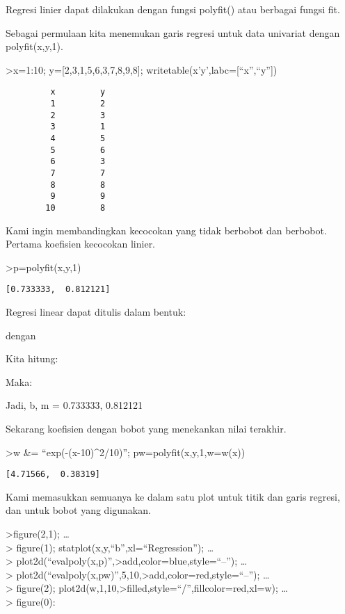 \documentclass[
]{book}
\begin{document}
Regresi linier dapat dilakukan dengan fungsi polyfit() atau berbagai fungsi fit.

Sebagai permulaan kita menemukan garis regresi untuk data univariat dengan polyfit(x,y,1).

\textgreater x=1:10; y={[}2,3,1,5,6,3,7,8,9,8{]}; writetable(x'\textbar y',labc={[}``x'',``y''{]})

\begin{verbatim}
         x         y
         1         2
         2         3
         3         1
         4         5
         5         6
         6         3
         7         7
         8         8
         9         9
        10         8
\end{verbatim}

Kami ingin membandingkan kecocokan yang tidak berbobot dan berbobot. Pertama koefisien kecocokan linier.

\textgreater p=polyfit(x,y,1)

\begin{verbatim}
[0.733333,  0.812121]
\end{verbatim}

Regresi linear dapat ditulis dalam bentuk:

dengan

Kita hitung:

Maka:

Jadi, b, m = 0.733333, 0.812121

Sekarang koefisien dengan bobot yang menekankan nilai terakhir.

\textgreater w \&= ``exp(-(x-10)\^{}2/10)''; pw=polyfit(x,y,1,w=w(x))

\begin{verbatim}
[4.71566,  0.38319]
\end{verbatim}

Kami memasukkan semuanya ke dalam satu plot untuk titik dan garis regresi, dan untuk bobot yang digunakan.

\textgreater figure(2,1); \ldots{}\\
\textgreater{} figure(1); statplot(x,y,``b'',xl=``Regression''); \ldots{}\\
\textgreater{} plot2d(``evalpoly(x,p)'',\textgreater add,color=blue,style=``--''); \ldots{}\\
\textgreater{} plot2d(``evalpoly(x,pw)'',5,10,\textgreater add,color=red,style=``--''); \ldots{}\\
\textgreater{} figure(2); plot2d(w,1,10,\textgreater filled,style=``/'',fillcolor=red,xl=w); \ldots{}\\
\textgreater{} figure(0):
\end{document}
